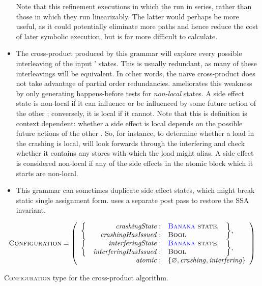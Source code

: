 \begin{itemize}
  Note that this refinement executions in which the {\StateMachines}
  run in series, rather than those in which they run linearizably.
  The latter would perhaps be more useful, as it could potentially
  eliminate more paths and hence reduce the cost of later symbolic
  execution, but is far more difficult to calculate.
\item The cross-product {\StateMachine} produced by this grammar will
  explore every possible interleaving of the input {\StateMachines}'
  states.  This is usually redundant, as many of these interleavings
  will be equivalent.  In other words, the na\"ive
  cross-product does not take advantage of partial order redundancies.
  {\Technique} ameliorates this weakness by only generating
  happens-before tests for \emph{non-local} states.  A side effect
  state is non-local if it can influence or be influenced by some
  future action of the other {\StateMachine}; conversely, it is local
  if it cannot.  Note that this is definition is context dependent:
  whether a side effect is local depends on the possible future
  actions of the other {\StateMachine}.  So, for
  instance, to determine whether a load in the crashing
  {\StateMachine} is local, {\technique} will look forwards through
  the interfering {\StateMachine} and check whether it contains any
  stores with which the load might alias.  A {\stStartAtomic} side
  effect is considered non-local if any of the side effects in the
  atomic block which it starts are non-local.
\item This grammar can sometimes duplicate side effect states, which
  might break static single assignment form.  {\Technique} uses a
  separate post pass to restore the SSA invariant.
\end{itemize}
\begin{sanefig}
  \begin{displaymath}
    \textsc{Configuration} = \left(\begin{array}{rrll}
      \multirow{2}{*}{\bigg\{} & \mathit{crashingState}: & \textsc{{\STateMachine} state}, & \multirow{2}{*}{\bigg\},}\\
                               & \mathit{crashingHasIssued}: & \textsc{Bool}\\
      \multirow{2}{*}{\bigg\{} & \mathit{interferingState}: & \textsc{{\STateMachine} state}, & \multirow{2}{*}{\bigg\},} \\
                               & \mathit{interferingHasIssued}: & \textsc{Bool}\\
      \multicolumn{2}{r}{\mathit{atomic}:} & \multicolumn{2}{l}{\{ \varnothing, \mathit{crashing}, \mathit{interfering} \}}
    \end{array}\right)
  \end{displaymath}
  \caption{\textsc{Configuration} type for the cross-product algorithm.}
  \label{fig:cross_product:configuration}
\end{sanefig}
